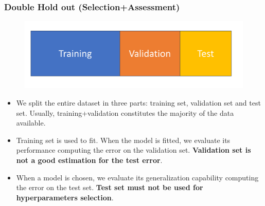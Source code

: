 \documentclass{beamer}
\begin{document}
	\begin{frame}
		\frametitle{Double Hold out (Selection+Assessment)}
		\begin{figure}
			\centering
			\includegraphics[scale=0.3]{images/hold-out}
		\end{figure}
		\begin{itemize}
			\item We split the entire dataset in three parts: training set, validation set and test set. Usually, training+validation constitutes the majority of the data available.
			\item Training set is used to fit. When the model is fitted, we evaluate its performance computing the error on the validation set.
			\textbf{Validation set is not a good estimation for the test error}.
			\item When a model is chosen, we evaluate its generalization capability computing the error on the test set. \textbf{Test set must not be used for hyperparameters selection}.
		\end{itemize}	
	\end{frame}
\end{document}
